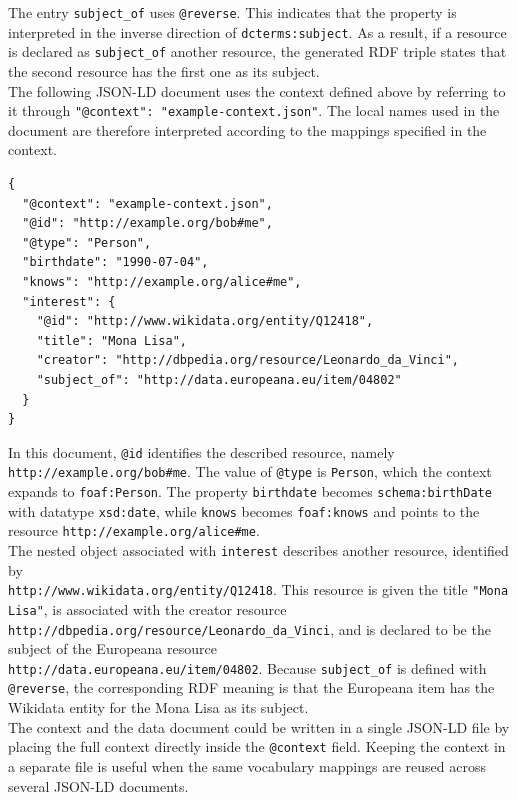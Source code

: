 \documentclass{scrbook}
\begin{document}
	The entry \texttt{subject\_of} uses \texttt{@reverse}. This indicates that the property is interpreted in the inverse direction of \texttt{dcterms:subject}. As a result, if a resource is declared as \texttt{subject\_of} another resource, the generated RDF triple states that the second resource has the first one as its subject.\\
	
	The following JSON-LD document uses the context defined above by referring to it through \texttt{"@context": "example-context.json"}. The local names used in the document are therefore interpreted according to the mappings specified in the context.
	
	\begin{lstlisting}
{
  "@context": "example-context.json",
  "@id": "http://example.org/bob#me",
  "@type": "Person",
  "birthdate": "1990-07-04",
  "knows": "http://example.org/alice#me",
  "interest": {
    "@id": "http://www.wikidata.org/entity/Q12418",
    "title": "Mona Lisa",
    "creator": "http://dbpedia.org/resource/Leonardo_da_Vinci",
    "subject_of": "http://data.europeana.eu/item/04802"
  }
}
	\end{lstlisting}
	
	In this document, \texttt{@id} identifies the described resource, namely \texttt{http://example.org/bob\#me}. The value of \texttt{@type} is \texttt{Person}, which the context expands to \texttt{foaf:Person}. The property \texttt{birthdate} becomes \texttt{schema:birthDate} with datatype \texttt{xsd:date}, while \texttt{knows} becomes \texttt{foaf:knows} and points to the resource \texttt{http://example.org/alice\#me}.\\
	
	The nested object associated with \texttt{interest} describes another resource, identified by\\
	\texttt{http://www.wikidata.org/entity/Q12418}. This resource is given the title \texttt{"Mona Lisa"}, is associated with the creator resource \texttt{http://dbpedia.org/resource/Leonardo\_da\_Vinci}, and is declared to be the subject of the Europeana resource\\
	\texttt{http://data.europeana.eu/item/04802}. Because \texttt{subject\_of} is defined with \texttt{@reverse}, the corresponding RDF meaning is that the Europeana item has the Wikidata entity for the Mona Lisa as its subject.\\
	
	The context and the data document could be written in a single JSON-LD file by placing the full context directly inside the \texttt{@context} field. Keeping the context in a separate file is useful when the same vocabulary mappings are reused across several JSON-LD documents.
	
\end{document}
